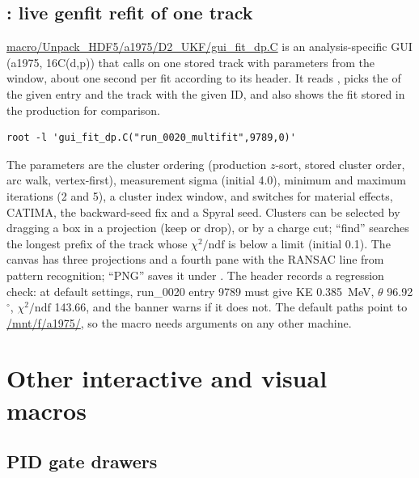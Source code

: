 \subsection{: live genfit refit of one track}

\url{macro/Unpack_HDF5/a1975/D2_UKF/gui_fit_dp.C} is an analysis-specific GUI (a1975,
16C(d,p)) that calls  on one stored track with parameters from the window, about
one second per fit according to its header. It reads
, picks the  of the given entry
and the track with the given ID, and also shows the fit stored in the production for comparison.
\begin{verbatim}
root -l 'gui_fit_dp.C("run_0020_multifit",9789,0)'
\end{verbatim}
The parameters are the cluster ordering (production $z$-sort, stored cluster order, arc walk,
vertex-first), measurement sigma (initial 4.0), minimum and maximum iterations (2 and 5), a cluster
index window, and switches for material effects, CATIMA, the backward-seed fix and a Spyral seed.
Clusters can be selected by dragging a box in a projection (keep or drop), or by a charge cut;
``find'' searches the longest prefix of the track whose $\chi^2/\mathrm{ndf}$ is below a limit
(initial 0.1). The canvas has three projections and a fourth pane with the RANSAC line from
pattern recognition; ``PNG'' saves it under . The header records a regression check:
at default settings, run\_0020 entry 9789 must give KE 0.385~MeV, $\theta$ 96.92$^\circ$,
$\chi^2/\mathrm{ndf}$ 143.66, and the banner warns if it does not. The default paths point to
\url{/mnt/f/a1975/}, so the macro needs arguments on any other machine.

\section{Other interactive and visual macros}
\label{sec:vis-macros}

\subsection{PID gate drawers}

